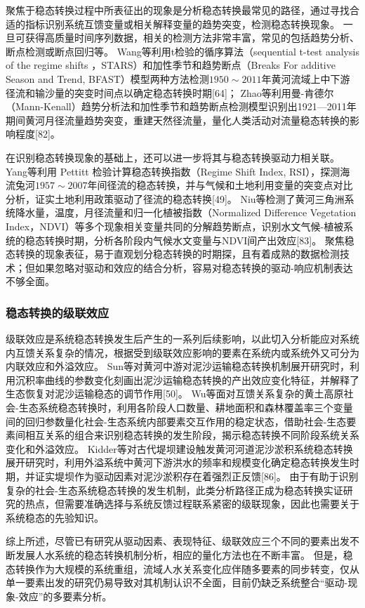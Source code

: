 聚焦于稳态转换过程中所表征出的现象是分析稳态转换最常见的路径，通过寻找合适的指标识别系统互馈变量或相关解释变量的趋势突变，检测稳态转换现象。
一旦可获得高质量时间序列数据，相关的检测方法非常丰富，常见的包括趋势分析、断点检测或断点回归等。
Wang等利用t检验的循序算法（sequential t-test analysis of the regime shifts ，STARS）和加性季节和趋势断点（Breaks For additive Season and Trend, BFAST）模型两种方法检测$1950 \sim 2011$年黄河流域上中下游径流和输沙量的突变时间点以确定稳态转换时期[64]；
Zhao等利用曼-肯德尔（Mann-Kenall）趋势分析法和加性季节和趋势断点检测模型识别出1921—2011年期间黄河月径流量趋势突变，重建天然径流量，量化人类活动对流量稳态转换的影响程度[82]。

在识别稳态转换现象的基础上，还可以进一步将其与稳态转换驱动力相关联。
Yang等利用 Pettitt 检验计算稳态转换指数（Regime Shift Index, RSI），探测海流兔河$1957 \sim 2007$年间径流的稳态转换，并与气候和土地利用变量的突变点对比分析，证实土地利用政策驱动了径流的稳态转换[49]。
Niu等检测了黄河三角洲系统降水量，温度，月径流量和归一化植被指数（Normalized Difference Vegetation Index，NDVI）等多个现象相关变量共同的分解趋势断点，识别水文气候-植被系统的稳态转换时期，分析各阶段内气候水文变量与NDVI间产出效应[83]。
聚焦稳态转换的现象表征，易于直观划分稳态转换的时期探，且有着成熟的数据检测技术；但如果忽略对驱动和效应的结合分析，容易对稳态转换的驱动-响应机制表达不够全面。

\subsubsection*{稳态转换的级联效应}

级联效应是系统稳态转换发生后产生的一系列后续影响，以此切入分析能应对系统内互馈关系复杂的情况，根据受到级联效应影响的要素在系统内或系统外又可分为内联效应和外溢效应。
Sun等对黄河中游对泥沙运输稳态转换机制展开研究时，利用沉积率曲线的参数变化刻画出泥沙运输稳态转换的产出效应变化特征，并解释了生态恢复对泥沙运输稳态的调节作用[50]。
Wu等面对互馈关系复杂的黄土高原社会-生态系统稳态转换时，利用各阶段人口数量、耕地面积和森林覆盖率三个变量间的回归参数量化社会-生态系统内部要素交互作用的稳定状态，借助社会-生态要素间相互关系的组合来识别稳态转换的发生阶段，揭示稳态转换不同阶段系统关系变化和外溢效应\cite{wu2020a}。
Kidder等对古代堤坝建设触发黄河河道泥沙淤积系统稳态转换展开研究时，利用外溢系统中黄河下游洪水的频率和规模变化确定稳态转换发生时期，并证实堤坝作为驱动因素对泥沙淤积存在着强烈正反馈[86]。
由于有助于识别复杂的社会-生态系统稳态转换的发生机制，此类分析路径正成为稳态转换实证研究的热点，但需要准确选择与系统反馈过程联系紧密的级联现象，因此也需要关于系统稳态的先验知识。

综上所述，尽管已有研究从驱动因素、表现特征、级联效应三个不同的要素出发不断发展人水系统的稳态转换机制分析，相应的量化方法也在不断丰富。
但是，稳态转换作为大规模的系统重组，流域人水关系变化应伴随多要素的同步转变，仅从单一要素出发的研究仍易导致对其机制认识不全面，目前仍缺乏系统整合“驱动-现象-效应”的多要素分析。
